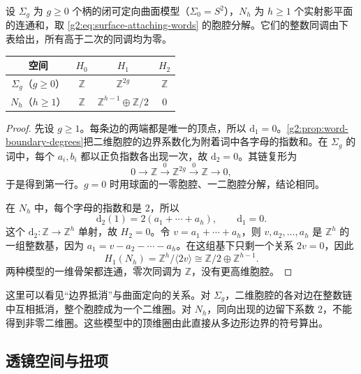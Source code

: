\begin{proposition}\label{g2:prop:surface-integer-homology}
	设 \(\Sigma_g\) 为 \(g\ge0\) 个柄的闭可定向曲面模型（\(\Sigma_0=S^2\)），\(N_h\) 为 \(h\ge1\) 个实射影平面的连通和，取 \eqref{g2:eq:surface-attaching-words} 的胞腔分解。它们的整数同调由下表给出，所有高于二次的同调均为零。
	\begin{center}
		\begin{tabular}{cccc}
			\toprule
			空间 & \(H_0\) & \(H_1\) & \(H_2\)\\
			\midrule
			\(\Sigma_g\)（\(g\geq0\)） & \(\mathbb Z\) & \(\mathbb Z^{2g}\) & \(\mathbb Z\)\\
			\(N_h\)（\(h\geq1\)） & \(\mathbb Z\) & \(\mathbb Z^{h-1}\oplus\mathbb Z/2\) & \(0\)\\
			\bottomrule
		\end{tabular}
	\end{center}
\end{proposition}
\begin{proof}
	先设 \(g\geq1\)。每条边的两端都是唯一的顶点，所以 \(\mathrm{d}_1=0\)。\cref{g2:prop:word-boundary-degrees}把二维胞腔的边界系数化为附着词中各字母的指数和。在 \(\Sigma_g\) 的词中，每个 \(a_i,b_i\) 都以正负指数各出现一次，故 \(\mathrm{d}_2=0\)。其链复形为
	\[
		0\longrightarrow\mathbb Z\xrightarrow{0}\mathbb Z^{2g}
		\xrightarrow{0}\mathbb Z\longrightarrow0,
	\]
	于是得到第一行。\(g=0\) 时用球面的一零胞腔、一二胞腔分解，结论相同。

	在 \(N_h\) 中，每个字母的指数和是 \(2\)，所以
	\[
		\mathrm{d}_2(1)=2(a_1+\cdots+a_h),\qquad\mathrm{d}_1=0.
	\]
	这个 \(\mathrm{d}_2:\mathbb Z\to\mathbb Z^h\) 单射，故 \(H_2=0\)。令 \(v=a_1+\cdots+a_h\)，则 \(v,a_2,\ldots,a_h\) 是 \(\mathbb Z^h\) 的一组整数基，因为 \(a_1=v-a_2-\cdots-a_h\)。在这组基下只剩一个关系 \(2v=0\)，因此
	\[
		H_1(N_h)=\mathbb Z^h/\langle2v\rangle
		\cong\mathbb Z/2\oplus\mathbb Z^{h-1}.
	\]
	两种模型的一维骨架都连通，零次同调为 \(\mathbb Z\)，没有更高维胞腔。
\end{proof}

这里可以看见“边界抵消”与曲面定向的关系。对 \(\Sigma_g\)，二维胞腔的各对边在整数链中互相抵消，整个胞腔成为一个二维圈。对 \(N_h\)，同向出现的边留下系数 \(2\)，不能得到非零二维圈。这些模型中的顶维圈由此直接从多边形边界的符号算出。

\subsection{透镜空间与扭项}
\label{g2:subsec:0303:03}

